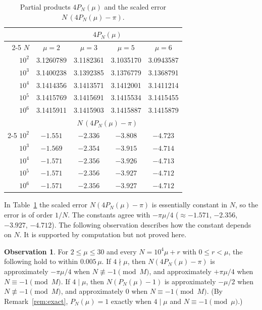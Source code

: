 \documentclass{amsart}
\theoremstyle{definition}
\newtheorem{observation}{Observation}
\theoremstyle{remark}
\begin{document}
\begin{table}[ht]
\centering
\caption{Partial products $4P_N(\mu)$ and the scaled error $N\,(4P_N(\mu)-\pi)$.}
\label{tab:small}
\begin{tabular}{r cccc}
\toprule
 & \multicolumn{4}{c}{$4P_N(\mu)$}\\
\cmidrule(lr){2-5}
$N$ & $\mu=2$ & $\mu=3$ & $\mu=5$ & $\mu=6$\\
\midrule
$10^2$ & 3.1260789 & 3.1182361 & 3.1035170 & 3.0943587\\
$10^3$ & 3.1400238 & 3.1392385 & 3.1376779 & 3.1368791\\
$10^4$ & 3.1414356 & 3.1413571 & 3.1412001 & 3.1411214\\
$10^5$ & 3.1415769 & 3.1415691 & 3.1415534 & 3.1415455\\
$10^6$ & 3.1415911 & 3.1415903 & 3.1415887 & 3.1415879\\
\midrule
 & \multicolumn{4}{c}{$N\,(4P_N(\mu)-\pi)$}\\
\cmidrule(lr){2-5}
$10^2$ & $-1.551$ & $-2.336$ & $-3.808$ & $-4.723$\\
$10^3$ & $-1.569$ & $-2.354$ & $-3.915$ & $-4.714$\\
$10^4$ & $-1.571$ & $-2.356$ & $-3.926$ & $-4.713$\\
$10^5$ & $-1.571$ & $-2.356$ & $-3.927$ & $-4.712$\\
$10^6$ & $-1.571$ & $-2.356$ & $-3.927$ & $-4.712$\\
\bottomrule
\end{tabular}
\end{table}

In Table~\ref{tab:small} the scaled error $N(4P_N(\mu)-\pi)$ is essentially constant in $N$, so the error is of order $1/N$. The constants agree with $-\pi\mu/4$ ($\approx-1.571$, $-2.356$, $-3.927$, $-4.712$). The following observation describes how the constant depends on $N$. It is supported by computation but not proved here.

\begin{observation}\label{obs:rate}
For $2\le\mu\le30$ and every $N=10^4\mu+r$ with $0\le r<\mu$, the following hold to within $0.005\,\mu$. If $4\nmid\mu$, then $N(4P_N(\mu)-\pi)$ is approximately $-\pi\mu/4$ when $N\not\equiv-1\pmod M$, and approximately $+\pi\mu/4$ when $N\equiv-1\pmod M$. If $4\mid\mu$, then $N(P_N(\mu)-1)$ is approximately $-\mu/2$ when $N\not\equiv-1\pmod M$, and approximately $0$ when $N\equiv-1\pmod M$. (By Remark~\ref{rem:exact}, $P_N(\mu)=1$ exactly when $4\mid\mu$ and $N\equiv-1\pmod\mu$.)
\end{observation}
\end{document}
